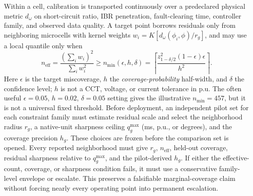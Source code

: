 \documentclass[conference]{IEEEtran}
\begin{document}
Within a cell, calibration is transported continuously over a predeclared physical metric $d_\omega$ on short-circuit ratio, IBR penetration, fault-clearing time, controller family, and observed data quality. A target point borrows residuals only from neighboring microcells with kernel weights $w_i=K[d_\omega(\phi_i,\phi)/r_g]$, and may use a local quantile only when
\begin{equation}
n_{\mathrm{eff}}=\frac{(\sum_iw_i)^2}{\sum_iw_i^2}
\geq n_{\min}(\epsilon,h,\delta)=
\left\lceil\frac{z_{1-\delta/2}^2(1-\epsilon)\epsilon}{h^2}\right\rceil.
\label{eq:neff}
\end{equation}
Here $\epsilon$ is the target miscoverage, $h$ the \emph{coverage-probability} half-width, and $\delta$ the confidence level; $h$ is not a CCT, voltage, or current tolerance in p.u. The often useful $\epsilon=0.05$, $h=0.02$, $\delta=0.05$ setting gives the illustrative $n_{\min}=457$, but it is not a universal fixed threshold. Before deployment, an independent pilot set for each constraint family must estimate residual scale and select the neighborhood radius $r_g$, a native-unit sharpness ceiling $q^{\max}_g$ (ms, p.u., or degrees), and the coverage precision $h_g$. These choices are frozen before the comparison set is opened. Every reported neighborhood must give $r_g$, $n_{\mathrm{eff}}$, held-out coverage, residual sharpness relative to $q^{\max}_g$, and the pilot-derived $h_g$. If either the effective-count, coverage, or sharpness condition fails, it must use a conservative family-level envelope or escalate. This preserves a falsifiable marginal-coverage claim without forcing nearly every operating point into permanent escalation.
\end{document}
